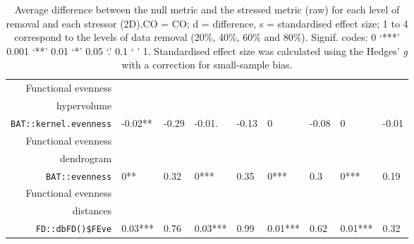 \begin{table}[ht]
\begin{tabular}{rllllllll}
  Functional evenness\\ hypervolume\\ \texttt{BAT::kernel.evenness} & -0.02** & -0.29 & -0.01. & -0.13 & 0 & -0.08 & 0 & -0.01 \\ 
  Functional evenness\\ dendrogram\\ \texttt{BAT::evenness} & 0** & 0.32 & 0*** & 0.35 & 0*** & 0.3 & 0*** & 0.19 \\ 
  Functional evenness\\ distances\\ \texttt{FD::dbFD()\$FEve} & 0.03*** & 0.76 & 0.03*** & 0.99 & 0.01*** & 0.62 & 0.01*** & 0.32 \\ 
   \hline
\end{tabular}
\caption{Average difference between the null metric and the stressed metric (raw) for each level of removal and each stressor (2D).CO = CO; d = difference, s = standardised effect size; 1 to 4 correspond to the levels of data removal (20\%, 40\%, 60\% and 80\%). Signif. codes:  0 ‘***’ 0.001 ‘**’ 0.01 ‘*’ 0.05 ‘.’ 0.1 ‘ ’ 1. Standardised effect size was calculated using the Hedges' \textit{g} with a correction for small-sample bias.} 
\end{table}
